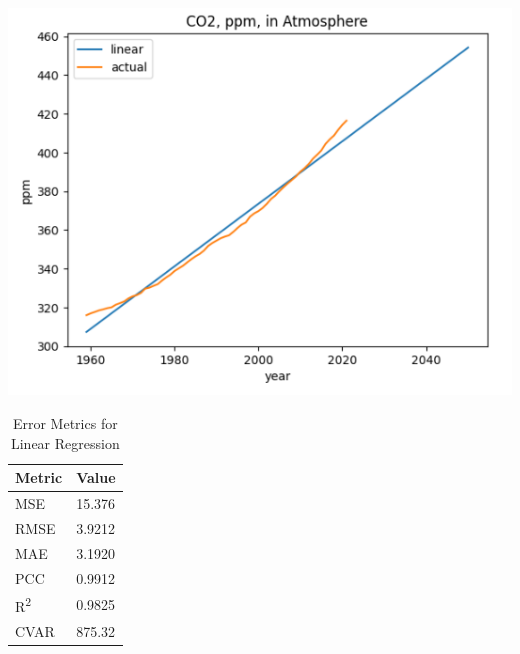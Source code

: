 \documentclass{mcmthesis}
\begin{document}
    \begin{table}[h]
        \begin{minipage}{0.7\linewidth}
            \centering
            \includegraphics[width=\textwidth]{linear}%
            \label{fig:co2_lr}
        \end{minipage}%
        \begin{minipage}{0.3\linewidth}
            \centering
            \begin{tabular}{ll}
                \toprule
                Metric               & Value  \\
                \midrule
                MSE                  & 15.376 \\
                RMSE                 & 3.9212 \\
                MAE                  & 3.1920 \\
                PCC                  & 0.9912 \\
                R\textsuperscript{2} & 0.9825 \\
                CVAR                 & 875.32 \\
                \bottomrule
            \end{tabular}
            \vspace{8pt}
            \caption{Error Metrics for Linear Regression}
            \label{tab:co2_lr_err}
        \end{minipage}
    \end{table}
\end{document}
